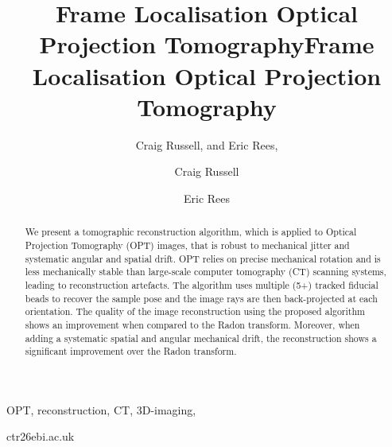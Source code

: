 \documentclass{osa-article}
\begin{document}
\title{Frame Localisation Optical Projection Tomography}


\ifdefined\osa
    \author{Craig Russell, and Eric Rees,}

    \address{Dept. of Chemical Engineering and Biotechnology, Cambridge University, Cambridge, U.K. \\
     European Bioinformatics Institute, Wellcome Genome Campus, Cambridge CB10 1SD}
\else
    \title{Frame Localisation Optical Projection Tomography}
    \author[1,2]{Craig Russell}
    \author[1,\Letter]{Eric Rees}



    \maketitle

    \linenumbers


    \begin{keywords}
     OPT, reconstruction, CT, 3D-imaging,
    \end{keywords}

    \begin{corrauthor}
     ctr26\at ebi.ac.uk
    \end{corrauthor}

\fi




\begin{abstract}
  We present a tomographic reconstruction algorithm, which is applied to Optical Projection Tomography (OPT) images, that is robust to mechanical jitter and systematic angular and spatial drift.
  OPT relies on precise mechanical rotation and is less mechanically stable than large-scale computer tomography (CT) scanning systems, leading to reconstruction artefacts.
  The algorithm uses multiple (5+) tracked fiducial beads to recover the sample pose and the image rays are then back-projected at each orientation.
  The quality of the image reconstruction using the proposed algorithm shows an improvement when compared to the Radon transform.
  Moreover, when adding a systematic spatial and angular mechanical drift, the reconstruction shows a significant improvement over the Radon transform.
\end{abstract}
\end{document}
